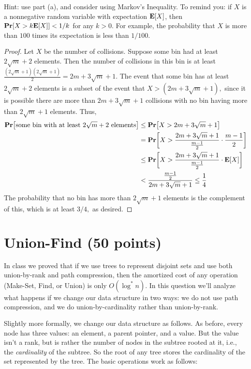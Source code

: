 \documentclass{article}
\newcommand{\prob}[1]{\ensuremath{\text{{\bf Pr}$\left[#1\right]$}}}
\newcommand{\expct}[1]{\ensuremath{\text{{\bf E}$\left[#1\right]$}}}
\begin{document}
\begin{enumerate}[(a)]
		Hint: use part (a), and consider using Markov's Inequality.  To remind you: if $X$ is a nonnegative random variable with expectation $\expct{X}$, then $\prob{X > k \expct{X}} < 1/k$ for any $k > 0$.  For example, the probability that $X$ is more than $100$ times its expectation is less than $1/100$.  
		\begin{proof}
			Let $X$ be the number of collisions. Suppose some bin had at least $2\sqrt{m}+2$ elements. Then the number of collisions in this bin is at least $\frac{(2\sqrt{m}+1)(2\sqrt{m}+1)}{2} = 2m+3\sqrt{m}+1.$ The event that some bin has at least $2\sqrt{m}+2$ elements is a subset of the event that $X>(2m+3\sqrt{m}+1),$ since it is possible there are more than $2m+3\sqrt{m}+1$ collisions with no bin having more than $2\sqrt{m}+1$ elements. Thus,
			\begin{align*}
				\prob{\text{some bin with at least }2\sqrt{m}+2\text{ elements}} &\le \prob{X>2m+3\sqrt{m}+1} \\
				&= \prob{X>\frac{2m+3\sqrt{m}+1}{\frac{m-1}{2}}\cdot \frac{m-1}{2}} \\
				&\le \prob{X>\frac{2m+3\sqrt{m}+1}{\frac{m-1}{2}}\cdot \expct{X}} \\
				&< \frac{\frac{m-1}{2}}{2m+3\sqrt{m}+1} \le \frac{1}{4}
			\end{align*}
			The probability that no bin has more than $2\sqrt{m}+1$ elements is the complement of this, which is at least $3/4,$ as desired.
		\end{proof}

\end{enumerate}

\section{Union-Find (50 points)}

In class we proved that if we use trees to represent disjoint sets and use both union-by-rank and path compression, then the amortized cost of any operation (Make-Set, Find, or Union) is only $O(\log^* n)$.  In this question we'll analyze what happens if we change our data structure in two ways: we do not use path compression, and we do union-by-cardinality rather than union-by-rank.

Slightly more formally, we change our data structure as follows.  As before, every node has three values: an element, a parent pointer, and a value.  But the value isn't a rank, but is rather the number of nodes in the subtree rooted at it, i.e., the \emph{cardinality} of the subtree.  So the root of any tree stores the cardinality of the set represented by the tree. The basic operations work as follows:
\end{document}
